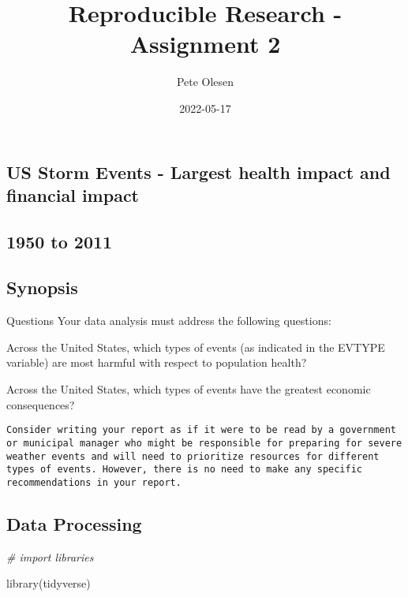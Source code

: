 \documentclass[
]{article}
\title{Reproducible Research - Assignment 2}
\author{Pete Olesen}
\date{2022-05-17}
\newenvironment{Shaded}{\begin{snugshade}}{\end{snugshade}}
\newcommand{\CommentTok}[1]{\textcolor[rgb]{0.56,0.35,0.01}{\textit{#1}}}
\newcommand{\FunctionTok}[1]{\textcolor[rgb]{0.00,0.00,0.00}{#1}}
\newcommand{\NormalTok}[1]{#1}
\begin{document}
\maketitle

\hypertarget{us-storm-events---largest-health-impact-and-financial-impact}{%
\subsection{US Storm Events - Largest health impact and financial
impact}\label{us-storm-events---largest-health-impact-and-financial-impact}}

\hypertarget{to-2011}{%
\subsection{1950 to 2011}\label{to-2011}}

\hypertarget{synopsis}{%
\subsection{Synopsis}\label{synopsis}}

Questions Your data analysis must address the following questions:

Across the United States, which types of events (as indicated in the
\color{red}{\verb|EVTYPE|}EVTYPE variable) are most harmful with respect
to population health?

Across the United States, which types of events have the greatest
economic consequences?

\begin{verbatim}
Consider writing your report as if it were to be read by a government or municipal manager who might be responsible for preparing for severe weather events and will need to prioritize resources for different types of events. However, there is no need to make any specific recommendations in your report.
\end{verbatim}

\hypertarget{data-processing}{%
\subsection{Data Processing}\label{data-processing}}

\begin{Shaded}
\begin{Highlighting}[]
\CommentTok{\# import libraries}

\FunctionTok{library}\NormalTok{(tidyverse)}
\end{Highlighting}
\end{Shaded}
\end{document}

